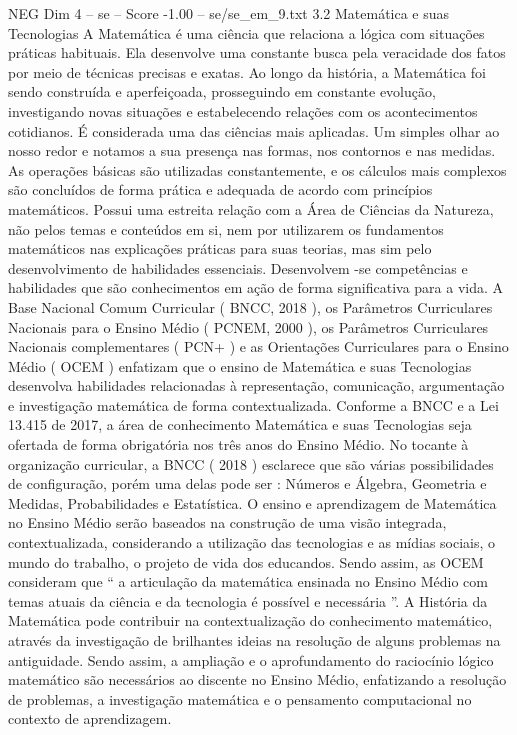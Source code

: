 \begin{textsample}{NEG Dim 4 – se – Score -1.00 – se/se\_em\_9.txt}  \label{ex:f4_neg_144}
3.2 Matemática e suas Tecnologias A Matemática é uma ciência que relaciona a lógica com situações práticas habituais.
Ela desenvolve uma constante busca pela veracidade dos fatos por meio de técnicas precisas e exatas.
Ao longo da história, a Matemática foi sendo construída e aperfeiçoada, prosseguindo em constante evolução, investigando novas situações e estabelecendo relações com os acontecimentos cotidianos.
É considerada uma das ciências mais aplicadas.
Um simples olhar ao nosso redor e notamos a sua presença nas formas, nos contornos e nas medidas.
As operações básicas são utilizadas constantemente, e os cálculos mais complexos são concluídos de forma prática e adequada de acordo com princípios matemáticos.
Possui uma estreita relação com a Área de Ciências da Natureza, não pelos temas e conteúdos em si, nem por utilizarem os fundamentos matemáticos nas explicações práticas para suas teorias, mas sim pelo desenvolvimento de habilidades essenciais.
Desenvolvem -se competências e habilidades que são conhecimentos em ação de forma significativa para a vida.
A Base Nacional Comum Curricular ( BNCC, 2018 ), os Parâmetros Curriculares Nacionais para o Ensino Médio ( PCNEM, 2000 ), os Parâmetros Curriculares Nacionais complementares ( PCN+ ) e as Orientações Curriculares para o Ensino Médio ( OCEM ) enfatizam que o ensino de Matemática e suas Tecnologias desenvolva habilidades relacionadas à representação, comunicação, argumentação e investigação matemática de forma contextualizada.
Conforme a BNCC e a Lei 13.415 de 2017, a área de conhecimento Matemática e suas Tecnologias seja ofertada de forma obrigatória nos três anos do Ensino Médio.
No tocante à organização curricular, a BNCC ( 2018 ) esclarece que são várias possibilidades de configuração, porém uma delas pode ser : Números e Álgebra, Geometria e Medidas, Probabilidades e Estatística.
O ensino e aprendizagem de Matemática no Ensino Médio serão baseados na construção de uma visão integrada, contextualizada, considerando a utilização das tecnologias e as mídias sociais, o mundo do trabalho, o projeto de vida dos educandos.
Sendo assim, as OCEM consideram que “ a articulação da matemática ensinada no Ensino Médio com temas atuais da ciência e da tecnologia é possível e necessária ”.
A História da Matemática pode contribuir na contextualização do conhecimento matemático, através da investigação de brilhantes ideias na resolução de alguns problemas na antiguidade.
Sendo assim, a ampliação e o aprofundamento do raciocínio lógico matemático são necessários ao discente no Ensino Médio, enfatizando a resolução de problemas, a investigação matemática e o pensamento computacional no contexto de aprendizagem.

\end{textsample}
